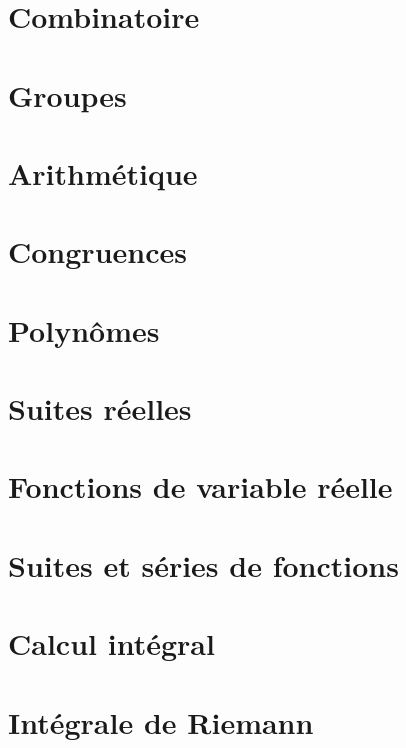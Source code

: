 \chapter{Combinatoire}
\chapter{Groupes}
\chapter{Arithmétique}
\chapter{Congruences}
\chapter{Polynômes}
\chapter{Suites réelles}
\chapter{Fonctions de variable réelle}
\chapter{Suites et séries de fonctions}
\chapter{Calcul intégral}
\chapter{Intégrale de Riemann}
